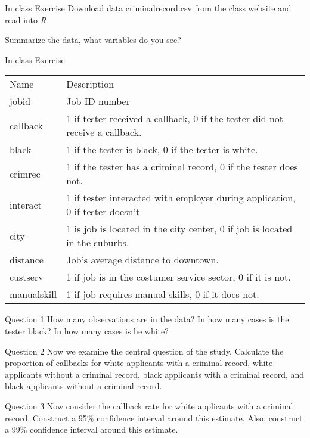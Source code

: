 \documentclass[presentation]{beamer}
\begin{document}
\begin{frame}[label={sec:org6c1f789}]{In class Exercise}
Download data criminalrecord.csv from the class website and read into \emph{R}

Summarize the data, what variables do you see?
\end{frame}


\begin{frame}[shrink=30,label={sec:org7f32b8c}]{In class Exercise}
\begin{center}
\begin{tabular}{ll}
Name & Description\\
jobid & Job ID number\\
callback & 1 if tester received a callback, 0 if the tester did not receive a callback.\\
black & 1 if the tester is black, 0 if the tester is white.\\
crimrec & 1 if the tester has a criminal record, 0 if the tester does not.\\
interact & 1 if tester interacted with employer during application, 0 if tester doesn’t\\
city & 1 is job is located in the city center, 0 if job is located in the suburbs.\\
distance & Job’s average distance to downtown.\\
custserv & 1 if job is in the costumer service sector, 0 if it is not.\\
manualskill & 1 if job requires manual skills, 0 if it does not.\\
\end{tabular}
\end{center}
\end{frame}


\begin{frame}[label={sec:orgf086d40}]{Question 1}
How many observations are in the data? In how many cases is the tester black? In how many cases is he white?
\end{frame}

\begin{frame}[label={sec:org2cce46e}]{Question 2}
Now we examine the central question of the study. Calculate the proportion of callbacks for white applicants with a criminal record, white applicants without a criminal record, black applicants with a criminal record, and black applicants without a criminal record.
\end{frame}

\begin{frame}[label={sec:org01a49ea}]{Question 3}
Now consider the callback rate for white applicants with a criminal record. Construct a 95\% confidence interval around this estimate. Also, construct a 99\% confidence interval around this estimate.
\end{frame}
\end{document}
